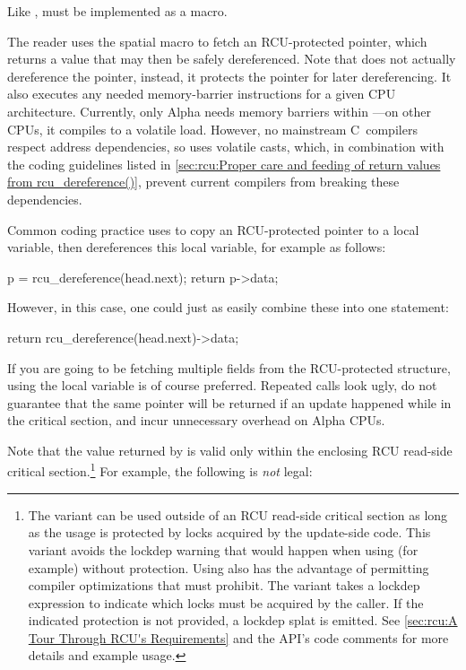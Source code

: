 \begin{description}
	Like ,  must be implemented
	as a macro.

	The reader uses the spatial  macro to fetch
	an RCU-protected pointer, which returns a value that may
	then be safely dereferenced.
	Note that 
	does not actually dereference the pointer, instead, it
	protects the pointer for later dereferencing.
	It also
	executes any needed memory-barrier instructions for a given
	CPU architecture.
	Currently, only Alpha needs memory barriers
	within ---on other CPUs, it compiles to a
	volatile load.
	However, no mainstream C~compilers respect
	address dependencies, so  uses volatile casts,
	which, in combination with the coding guidelines listed in
	\cref{sec:rcu:Proper care and feeding of return values from rcu_dereference()},
	prevent current compilers from breaking
	these dependencies.

	Common coding practice uses  to copy an
	RCU-protected pointer to a local variable, then dereferences
	this local variable, for example as follows:

\begin{VerbatimU}
		p = rcu_dereference(head.next);
		return p->data;
\end{VerbatimU}

	However, in this case, one could just as easily combine these
	into one statement:

\begin{VerbatimU}
		return rcu_dereference(head.next)->data;
\end{VerbatimU}

	If you are going to be fetching multiple fields from the
	RCU-protected structure, using the local variable is of
	course preferred.
	Repeated  calls look
	ugly, do not guarantee that the same pointer will be returned
	if an update happened while in the critical section, and incur
	unnecessary overhead on Alpha CPUs.

	Note that the value returned by  is valid
	only within the enclosing RCU read-side critical section.\footnote{
		The variant  can be used outside
		of an RCU read-side critical section as long as the usage is
		protected by locks acquired by the update-side code.
		This variant
		avoids the lockdep warning that would happen when using (for
		example)  without  protection.
		Using  also has the advantage
		of permitting compiler optimizations that 
		must prohibit.
		The  variant takes
		a lockdep expression to indicate which locks must be acquired
		by the caller.
		If the indicated protection is not provided,
		a lockdep splat is emitted.
		See \cref{sec:rcu:A Tour Through RCU's Requirements}
		and the API's code comments for more details and example usage.}
	For example, the following is \emph{not} legal:


\end{description}
